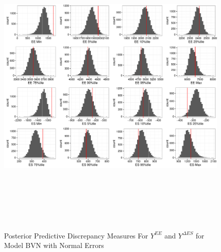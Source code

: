 \documentclass[11pt]{article}\usepackage[]{graphicx}\usepackage[]{color}
\begin{document}
  \begin{figure}
  \centering
  \includegraphics[width=17cm,height=15cm]{manual_figure/wpydiagbvn.pdf}
  \caption{Posterior Predictive Discrepancy Measures For $Y^{EE}$ and $Y^{\Delta ES}$ for Model BVN with Normal Errors}
  \label{wpydiagbvn}
  \end{figure}
% 
% 
\end{document}
